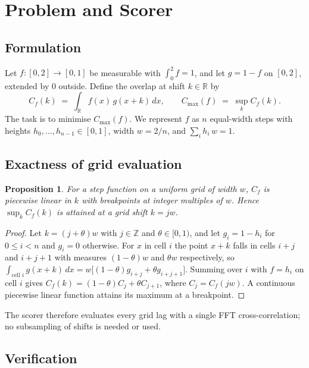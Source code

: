 \documentclass[11pt]{article}
\newtheorem{proposition}{Proposition}
\newcommand{\Cmax}{C_{\max}}
\newcommand{\R}{\mathbb{R}}
\begin{document}
\section{Problem and Scorer}

\subsection{Formulation}

Let $f:[0,2]\to[0,1]$ be measurable with $\int_0^2 f = 1$, and let $g = 1-f$ on
$[0,2]$, extended by $0$ outside. Define the overlap at shift $k\in\R$ by
\begin{equation}
  C_f(k) \;=\; \int_{\R} f(x)\,g(x+k)\,dx ,
  \qquad
  \Cmax(f) \;=\; \sup_{k} C_f(k).
\end{equation}
The task is to minimise $\Cmax(f)$. We represent $f$ as $n$ equal-width steps
with heights $h_0,\dots,h_{n-1}\in[0,1]$, width $w=2/n$, and
$\sum_i h_i\,w = 1$.

\subsection{Exactness of grid evaluation}

\begin{proposition}
For a step function on a uniform grid of width $w$, $C_f$ is piecewise linear
in $k$ with breakpoints at integer multiples of $w$. Hence
$\sup_k C_f(k)$ is attained at a grid shift $k=jw$.
\end{proposition}

\begin{proof}
Let $k=(j+\theta)w$ with $j\in\mathbb{Z}$ and $\theta\in[0,1)$, and let
$g_i = 1-h_i$ for $0\le i<n$ and $g_i=0$ otherwise. For $x$ in cell $i$ the
point $x+k$ falls in cells $i+j$ and $i+j+1$ with measures $(1-\theta)w$ and
$\theta w$ respectively, so
$\int_{\text{cell } i} g(x+k)\,dx = w\big[(1-\theta)g_{i+j}+\theta g_{i+j+1}\big]$.
Summing over $i$ with $f=h_i$ on cell $i$ gives
$C_f(k)=(1-\theta)C_j+\theta C_{j+1}$, where $C_j=C_f(jw)$. A continuous
piecewise linear function attains its maximum at a breakpoint.
\end{proof}

The scorer therefore evaluates every grid lag with a single FFT
cross-correlation; no subsampling of shifts is needed or used.

\subsection{Verification}
\end{document}
